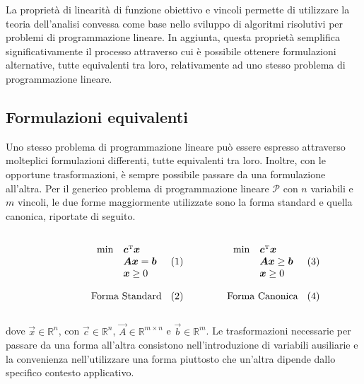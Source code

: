 La proprietà di linearità di funzione obiettivo e vincoli permette di utilizzare la teoria dell'analisi convessa come
base nello sviluppo di algoritmi risolutivi per problemi di programmazione lineare. In aggiunta, questa proprietà
semplifica significativamente il processo attraverso cui è possibile ottenere formulazioni alternative, tutte
equivalenti tra loro, relativamente ad uno stesso problema di programmazione lineare.

\subsection{Formulazioni equivalenti}
Uno stesso problema di programmazione lineare può essere espresso attraverso molteplici formulazioni differenti, tutte
equivalenti tra loro. Inoltre, con le opportune trasformazioni, è sempre possibile passare da una formulazione
all'altra. Per il generico problema di programmazione lineare
\(
    \mathcal{P}
\)
con \( n \) variabili e \( m \) vincoli, le due forme maggiormente utilizzate sono la forma standard e quella canonica,
riportate di seguito.

\begin{subequations}
\hspace*{.1\textwidth}
\begin{minipage}{.3\textwidth}
\begin{align}\notag
    \begin{array}{ll}
        \,\min & \vec{c}^{\tr} \vec{x} \\
               & \vec{A} \vec{x} = \vec{b} \\\label{eq:LPstd}
             & \vec{x} \ge 0
    \end{array}
    \\[7pt] \text{Forma Standard}
\end{align}
\end{minipage}\hspace{.1\textwidth}
\begin{minipage}{.3\textwidth}
    \begin{align}\notag
    \begin{array}{ll}
        \,\min & \vec{c}^{\tr} \vec{x} \\
               & \vec{A} \vec{x} \ge \vec{b} \\\label{eq:LPcanonical}
             & \vec{x} \ge 0
    \end{array}
    \\[7pt] \text{Forma Canonica}
\end{align}
\end{minipage}
\end{subequations}\\[10pt]
dove \( \vec{x} \in \mathbb{R}^n \), con \( \vec{c} \in \mathbb{R}^n \), \( \vec{A} \in \mathbb{R}^{m\times n} \) e \(
\vec{b} \in \mathbb{R}^m \). Le trasformazioni necessarie per passare da una forma all'altra consistono
nell'introduzione di variabili ausiliarie e la convenienza nell'utilizzare una forma piuttosto che un'altra dipende
dallo specifico contesto applicativo.

